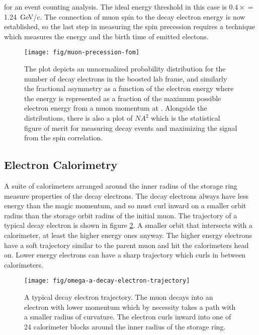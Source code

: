 \noindent
for an event counting analysis.  The ideal energy threshold in this case is $0.4\times$\pmagic$ = $ \SI{1.24}{\GeV/c}.  The connection of muon spin to the decay electron energy is now established, so the last step in measuring the spin precession requires a technique which measures the energy and the birth time of emitted electons. \cite{e821-prd}

\begin{figure}
\centering
\texttt{[image: fig/muon-precession-fom]}
\caption{The plot depicts an unnormalized probability distribution for the number of decay electrons in the boosted lab frame, and similarly the fractional asymmetry as a function of the electron energy where the energy is represented as a fraction of the maximum possible electron energy from a muon momentum at \pmagic. Alongside the distributions, there is also a plot of $NA^2$ which is the statistical figure of merit for measuring decay events and maximizing the signal from the spin correlation. \label{fig:muon-precession-fom}}
\end{figure}

\subsection{Electron Calorimetry}

A suite of calorimeters arranged around the inner radius of the storage ring measure properties of the decay electrons.  The decay electrons always have less energy than the magic momentum, and so must curl inward on a smaller orbit radius than the storage orbit radius of the initial muon.  The trajectory of a typical decay electron is shown in figure \ref{fig:omega-a-decay-electron-trajectory}.  A smaller orbit that intersects with a calorimeter, at least the higher energy ones anyway. The higher energy electrons have a soft trajectory similar to the parent muon and hit the calorimeters head on.  Lower energy electrons can have a sharp trajectory which curls in between calorimeters.

\begin{figure}
\texttt{[image: fig/omega-a-decay-electron-trajectory]}
\caption{A typical decay electron trajectory.  The muon decays into an electron with lower momentum which by necessity takes a path with a smaller radius of curvature.  The electron curls inward into one of 24 calorimeter blocks around the inner radius of the storage ring. \label{fig:omega-a-decay-electron-trajectory}}
\end{figure}

